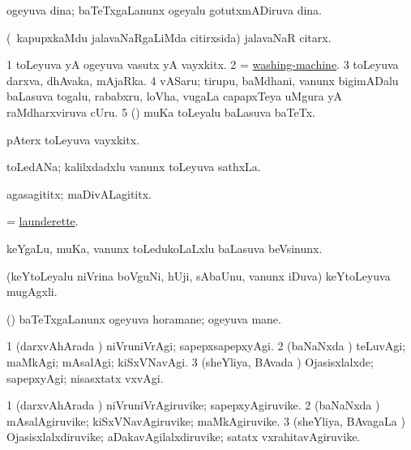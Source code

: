 \bentry
{} 
\gl{\nA}
\expl{}
\bmng
ogeyuva dina; baTeTxgaLanunx ogeyalu gotutxmADiruva dina. 
\emng
\eentry

\bentry
{} 
\gl{\nA}
\expl{}
\bmng
(\kanmu\ kapupxkaMdu jalavaNaRgaLiMda citirxsida) jalavaNaR citarx. 
\emng
\eentry

\bentry
{} 
\gl{\nA}
\expl{}
\bmng
\bnum
\num{1} toLeyuva yA ogeyuva vasutx yA vayxkitx. 
\num{2} = \hyperlink{washing-machine}{washing-machine}. 
\num{3} toLeyuva darxva, dhAvaka, mAjaRka. 
\num{4} vASaru; tirupu, baMdhani, \mo vanunx bigimADalu baLasuva togalu, rababxru, loVha, \mo vugaLa capapxTeya uMgura yA raMdharxviruva cUru. 
\num{5} (\AseTxrXV) muKa toLeyalu baLasuva baTeTx. 
\enum
\emng
\eentry

\bentry
{} 
\gl{\nA}
\bmng
pAterx toLeyuva vayxkitx. 
\emng
\eentry

\bentry
{} 
\gl{\nA}
\expl{}
\bmng
toLedANa; kalilxdadxlu \mo vanunx toLeyuva sathxLa. 
\emng
\eentry

\bentry
{} 
\gl{\nA}
\bmng
agasagititx; maDivALagititx. 
\emng
\eentry

\bentry
{} 
\gl{\nA}
\expl{}
\bmng
= \hyperref{kandict_l.pdf}{L}{launderette}{launderette}. 
\emng
\eentry

\bentry
{} 
\gl{\nA}
\expl{}
\bmng
keYgaLu, muKa, \mo vanunx toLedukoLaLxlu baLasuva beVsinunx. 
\emng
\eentry

\bentry
{} 
\gl{\nA}
\expl{}
\bmng
(keYtoLeyalu niVrina boVguNi, hUji, sAbaUnu, \mo vanunx iDuva) keYtoLeyuva mugAgxli. 
\emng
\eentry

\bentry
{} 
\gl{\nA}
\expl{}
\bmng
(\kanmu) baTeTxgaLanunx ogeyuva horamane; ogeyuva mane. 
\emng
\eentry

\bentry
{} 
\gl{\kirxvi}
\expl{}
\bmng
\bnum
\num{1} (darxvAhArada \vi) niVruniVrAgi; sapepxsapepxyAgi. 
\num{2} (baNaNxda \vi) teLuvAgi; maMkAgi; mAsalAgi; kiSxVNavAgi. 
\num{3} (sheYliya, BAvada \vi) Ojasisxlalxde; sapepxyAgi; nisasxtatx vxvAgi. 
\enum
\emng
\eentry

\bentry
{} 
\gl{\nA}
\expl{}
\bmng
\bnum
\num{1} (darxvAhArada \vi) niVruniVrAgiruvike; sapepxyAgiruvike. 
\num{2} (baNaNxda \vi) mAsalAgiruvike; kiSxVNavAgiruvike; maMkAgiruvike. 
\num{3} (sheYliya, BAvagaLa \vi) Ojasisxlalxdiruvike; aDakavAgilalxdiruvike; satatx vxrahitavAgiruvike. 
\enum
\emng
\eentry

